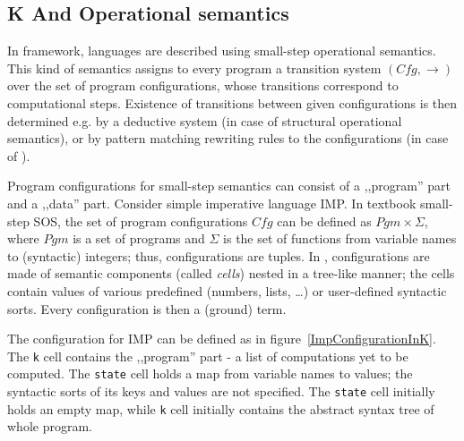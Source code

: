 \documentclass{fithesis3}
\newcommand{\var}[1]{\mathit{#1}}
\begin{document}
\subsection{K And Operational semantics}





In \K framework, languages are described using small-step operational semantics. This kind of semantics assigns to every program a transition system $( \var{Cfg}, \rightarrow )$ over the set of program configurations, whose transitions correspond to computational steps. Existence of transitions between given configurations is then determined e.g. by a deductive system (in case of structural operational semantics), or by pattern matching rewriting rules to the configurations (in case of \K).



Program configurations for small-step semantics can consist of a ,,program'' part and a ,,data'' part. Consider simple imperative language IMP. In textbook small-step SOS, the set of program configurations $\var{Cfg}$ can be defined as $\var{Pgm} \times \Sigma$, where $\var{Pgm}$ is a set of programs and $\Sigma$ is the set of functions from variable names to (syntactic) integers; thus, configurations are tuples. In \K, configurations are made of semantic components (called \textit{cells}) nested in a tree-like manner; the cells contain values of various predefined (numbers, lists, \ldots) or user-defined syntactic sorts. Every configuration is then a (ground) term.

The configuration for IMP can be defined as in figure~\ref{ImpConfigurationInK}. The \texttt{k} cell contains the ,,program'' part - a list of computations yet to be computed. The \texttt{state} cell holds a map from variable names to values; the syntactic sorts of its keys and values are not specified. The \texttt{state} cell initially holds an empty map, while \texttt{k} cell initially contains the abstract syntax tree of whole program.
\end{document}

